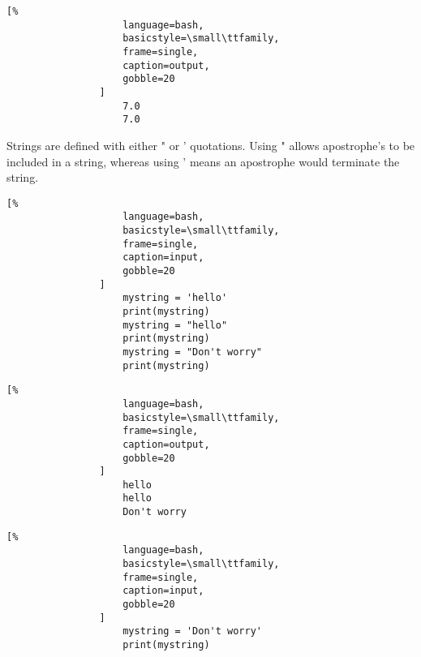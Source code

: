 \documentclass[crop=false,class=article,oneside]{standalone}
\begin{document}
            \hfill
            \begin{minipage}[t]{.48\textwidth}
                \centering
                \begin{lstlisting}[%
                    language=bash,
                    basicstyle=\small\ttfamily,
                    frame=single,
                    caption=output,
                    gobble=20
                ]
                    7.0
                    7.0
                \end{lstlisting}
            \end{minipage}
            Strings are defined with either " or ' quotations.
            Using " allows apostrophe's to be included
            in a string, whereas using ' means an apostrophe
            would terminate the string.\newline
            \begin{minipage}[t]{.48\textwidth}
                \centering
                \begin{lstlisting}[%
                    language=bash,
                    basicstyle=\small\ttfamily,
                    frame=single,
                    caption=input,
                    gobble=20
                ]
                    mystring = 'hello'
                    print(mystring)
                    mystring = "hello"
                    print(mystring)
                    mystring = "Don't worry"
                    print(mystring)
                \end{lstlisting}
            \end{minipage}\hfill
            \begin{minipage}[t]{.48\textwidth}
                \centering
                \begin{lstlisting}[%
                    language=bash,
                    basicstyle=\small\ttfamily,
                    frame=single,
                    caption=output,
                    gobble=20
                ]
                    hello
                    hello
                    Don't worry
                \end{lstlisting}
            \end{minipage}
            \begin{minipage}[t]{.48\textwidth}
                \centering
                \begin{lstlisting}[%
                    language=bash,
                    basicstyle=\small\ttfamily,
                    frame=single,
                    caption=input,
                    gobble=20
                ]
                    mystring = 'Don't worry'
                    print(mystring)
                \end{lstlisting}
            \end{minipage}\hfill
\end{document}
